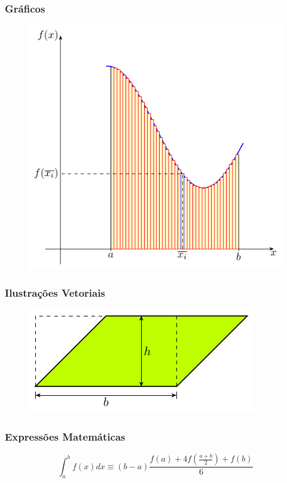 \documentclass{beamer}
\begin{document}
\begin{frame}\frametitle{Gráficos}
  \begin{figure}[h]
    \centering
    \includegraphics[height=0.6\paperheight]{img/integral}
  \end{figure}
\end{frame}

\begin{frame}\frametitle{Ilustrações Vetoriais}
  \begin{figure}[h]
    \centering
    \includegraphics[height=0.4\paperheight]{img/vetorial}
  \end{figure}
\end{frame}

\begin{frame}\frametitle{Expressões Matemáticas}
\[
\int_a^b f(x)dx \equiv (b - a)\frac{f(a) + 4f(\frac{a+b}{2}) + f(b)}{6}
\]
\end{frame}
\end{document}
